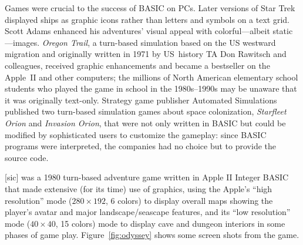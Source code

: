 Games were crucial to the success of BASIC on PCs.
Later versions of Star Trek displayed ships as graphic icons rather than
letters and symbols on a text grid.
Scott Adams enhanced his adventures' visual appeal with colorful---albeit
static---images.
\emph{Oregon Trail}, a turn-based simulation based on the US westward
migration and originally written in 1971 by US~history TA Don Rawitsch and colleagues,
received graphic enhancements and became
a bestseller on the Apple~II and other computers;
the millions of
North American elementary school students who played the game in school
in the 1980s--1990s
may be unaware that it was originally text-only.
Strategy game publisher
Automated Simulations published two turn-based simulation games about
space colonization,
\emph{Starfleet Orion} and \emph{Invasion Orion}, that were not only
written in BASIC but could be modified by sophisticated users to
customize the gameplay: since BASIC programs were interpreted, the
companies had no choice but to provide the source code.

 [sic] was a 1980 turn-based adventure game
written in Apple II Integer BASIC
that made extensive (for its time) use of
graphics, using the Apple's ``high resolution'' mode ($280\times 192$, 6 colors)
to display overall maps showing the player's
avatar and major landscape/seascape features, and its
``low resolution'' mode ($40\times 40$, 15
colors) mode to display cave and dungeon interiors in some phases of game play.
Figure~\ref{fig:odyssey} shows some screen shots from the game.


